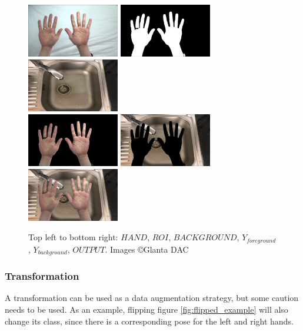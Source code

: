         \begin{figure}[h]
            \centering
            \includegraphics[width=114pt]{../img/handspipeline/1.png}
            \includegraphics[width=114pt]{../img/handspipeline/2.png}
            \includegraphics[width=114pt]{../img/handspipeline/3.png}\\
            \includegraphics[width=114pt]{../img/handspipeline/4.png}
            \includegraphics[width=114pt]{../img/handspipeline/5.png}
            \includegraphics[width=114pt]{../img/handspipeline/6.png}
            \caption{Top left to bottom right: $HAND$, $ROI$, $BACKGROUND$, $Y_{foreground}$, $Y_{background}$, $OUTPUT$. Images \copyright \space Glanta DAC}
            \label{fig:handlogicimg}
        \end{figure}

        \subsubsection{Transformation}
        A transformation can be used as a data augmentation strategy, but some caution needs to be used. As an example, flipping figure \ref{fig:flipped_example} will also change its class, since there is a corresponding pose for the left and right hands. 

